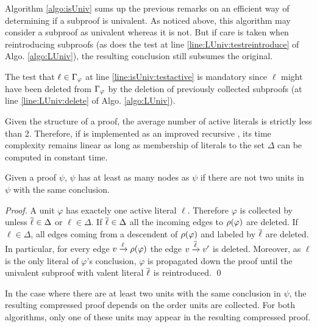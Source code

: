 \documentclass{llncs}
\begin{document}
Algorithm \ref{algo:isUniv} sums up the previous remarks on an efficient way of determining if a
subproof is univalent. As noticed above, this algorithm may consider a subproof as univalent whereas
it is not. But if care is taken when reintroducing subproofs (as does the test at line
\ref{line:LUniv:testreintroduce} of Algo. \ref{algo:LUniv}), the resulting conclusion still subsumes
the original.

The test that $\ell \in \Gamma_{\varphi}$ at line \ref{line:isUniv:testactive} is mandatory
since $\ell$ might have been deleted from $\Gamma_{\varphi}$ by the deletion of previously
collected subproofs (at line \ref{line:LUniv:delete} of Algo. \ref{algo:LUniv}).

Given the structure of a proof, the average number of active literals is strictly less than 2.
Therefore, if {\LowerUnivalents} is implemented as an improved recursive , its time
complexity remains linear as long as membership of literals to the set $\Delta$ can be computed in
constant time.

\begin{proposition}
Given a proof $\psi$,
{\LowerUnits\FuncSty{(}$\psi$\FuncSty{)}}
has at least as many nodes as 
{\LowerUnivalents\FuncSty{(}$\psi$\FuncSty{)}}
if there are not two units in $\psi$ with the same conclusion.
\end{proposition}

\begin{proof}
A unit $\varphi$ has exactely one active literal $\ell$. Therefore $\varphi$ is collected by
{\LowerUnivalents} unless $\overline{\ell} \in \Delta$ or $\ell \in \Delta$. If $\overline{\ell} \in \Delta$
all the incoming edges to $\rho(\varphi)$ are deleted. If $\ell \in \Delta$, all edges coming from
a descendent of $\rho(\varphi)$ and labeled by $\overline{\ell}$ are deleted. In particular, for every
edge $v \xrightarrow{\ell} \rho(\varphi)$ the edge $v \xrightarrow{\overline{\ell}} v'$ is deleted.
Moreover, as $\ell$ is the only literal of $\varphi$'s conclusion, $\varphi$ is propagated down the
proof until the univalent subproof with valent literal $\overline{\ell}$ is reintroduced. \qed
\end{proof}

In the case where there are at least two units with the same conclusion in $\psi$, the resulting
compressed proof depends on the order units are collected. For both algorithms, only one of these
units may appear in the resulting compressed proof.
\end{document}
